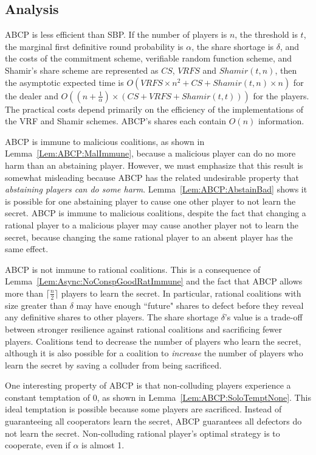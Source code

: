 \documentclass[12pt]{dalcsthesis}
\begin{document}
\subsection{Analysis}

ABCP is less efficient than SBP. If the number of players is $n$, the threshold is $t$, the marginal first definitive round probability is $\alpha$, the share shortage is $\delta$, and the costs of the commitment scheme, verifiable random function scheme, and Shamir's share scheme are represented as $CS$, $VRFS$ and $Shamir(t, n)$, then the asymptotic expected time is $O(VRFS  \times n^2 + CS + Shamir(t, n) \times n)$ for the dealer and $O((n + \frac{1}{\alpha}) \times (CS + VRFS + Shamir(t, t)))$ for the players. The practical costs depend primarily on the efficiency of the implementations of the VRF and Shamir schemes. ABCP's shares each contain $O(n)$ information.

ABCP is immune to malicious coalitions, as shown in Lemma~\ref{Lem:ABCP:MalImmune}, because a malicious player can do no more harm than an abstaining player. However, we must emphasize that this result is somewhat misleading because ABCP has the related undesirable property that \emph{abstaining players can do some harm}. Lemma~\ref{Lem:ABCP:AbstainBad} shows it is possible for one abstaining player to cause one other player to not learn the secret. ABCP is immune to malicious coalitions, despite the fact that changing a rational player to a malicious player may cause another player not to learn the secret, because changing the same rational player to an absent player has the same effect.

ABCP is not immune to rational coalitions. This is a consequence of Lemma~\ref{Lem:Async:NoConspGoodRatImmune} and the fact that ABCP allows more than $\lceil \frac{n}{2} \rceil$ players to learn the secret. In particular, rational coalitions with size greater than $\delta$ may have enough ``future" shares to defect before they reveal any definitive shares to other players. The share shortage $\delta$'s value is a trade-off between stronger resilience against rational coalitions and sacrificing fewer players. Coalitions tend to decrease the number of players who learn the secret, although it is also possible for a coalition to \emph{increase} the number of players who learn the secret by saving a colluder from being sacrificed.

One interesting property of ABCP is that non-colluding players experience a constant temptation of $0$, as shown in Lemma~\ref{Lem:ABCP:SoloTemptNone}. This ideal temptation is possible because some players are sacrificed. Instead of guaranteeing all cooperators learn the secret, ABCP guarantees all defectors do not learn the secret. Non-colluding rational player's optimal strategy is to cooperate, even if $\alpha$ is almost 1.
\end{document}
